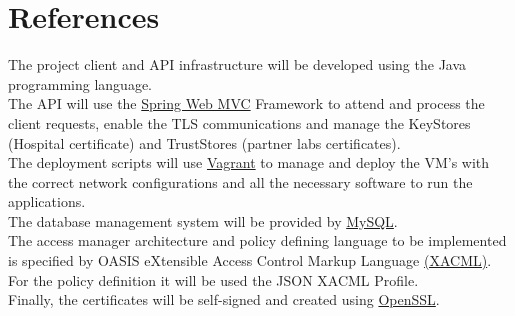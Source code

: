 \section{References}

The project client and API infrastructure will be developed using the Java programming language. \\

The API will use the \href{https://docs.spring.io/spring-framework/docs/3.2.x/spring-framework-reference/html/mvc.html}{Spring Web MVC} Framework to attend and process the client requests, enable the TLS communications and manage the KeyStores (Hospital certificate) and TrustStores (partner labs certificates). \\

The deployment scripts will use \href{https://www.vagrantup.com/}{Vagrant} to manage and deploy the VM's with the correct network configurations and all the necessary software to run the applications. \\

The database management system will be provided by \href{https://www.mysql.com/}{MySQL}. \\

The access manager architecture and policy defining language to be implemented is specified by OASIS eXtensible Access Control Markup Language \href{https://www.oasis-open.org/committees/tc_home.php?wg_abbrev=xacml#other}{(XACML)}. For the policy definition it will be used the JSON XACML Profile. \\

Finally, the certificates will be self-signed and created using \href{https://www.openssl.org/}{OpenSSL}. \\

